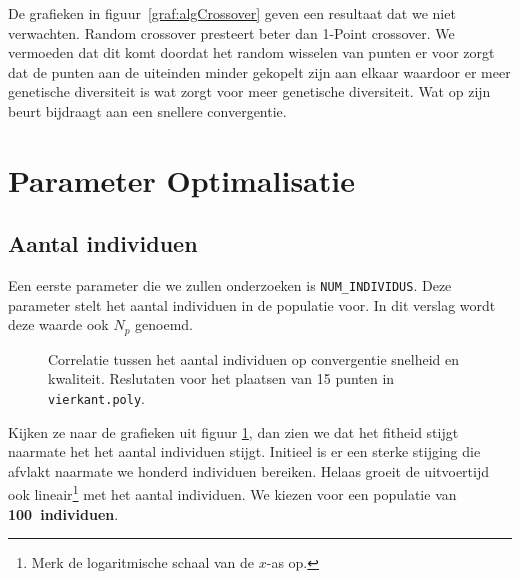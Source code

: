 De grafieken in figuur~\ref{graf:algCrossover} geven een resultaat dat we niet verwachten. Random crossover presteert beter dan 1-Point crossover. We vermoeden dat dit komt doordat het random wisselen van punten er voor zorgt dat de punten aan de uiteinden minder gekopelt zijn aan elkaar waardoor er meer genetische diversiteit is wat zorgt voor meer genetische diversiteit. Wat op zijn beurt bijdraagt aan een snellere convergentie. 

\section{Parameter Optimalisatie}
\subsection{Aantal individuen}
Een eerste parameter die we zullen onderzoeken is \texttt{NUM\_INDIVIDUS}. Deze parameter stelt het aantal individuen in de populatie voor. In dit verslag wordt deze waarde ook $N_p$ genoemd.
\begin{figure}[H]



  \caption{Correlatie tussen het aantal individuen op convergentie snelheid en kwaliteit. Reslutaten voor het plaatsen van 15 punten in \texttt{vierkant.poly}.}
  \label{graf:numIndividus}
\end{figure}
Kijken ze naar de grafieken uit figuur \ref{graf:numIndividus}, dan zien we dat het fitheid stijgt naarmate het het aantal individuen stijgt. Initieel is er een sterke stijging die afvlakt naarmate we honderd individuen bereiken. Helaas groeit de uitvoertijd ook lineair\footnote{Merk de logaritmische schaal van de $x$-as op.} met het aantal individuen. We kiezen voor een populatie van \textbf{100~individuen}. 
%
%
%
%
%

